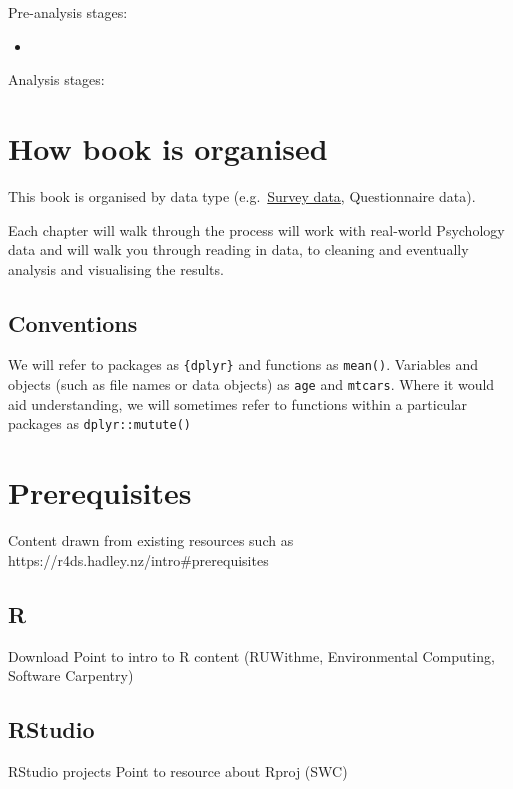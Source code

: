 \documentclass[
  letterpaper,
  DIV=11,
  numbers=noendperiod]{scrreprt}
\providecommand{\tightlist}{%
  \setlength{\itemsep}{0pt}\setlength{\parskip}{0pt}}\usepackage{longtable,booktabs,array}
\begin{document}
Pre-analysis stages:

\begin{itemize}
\tightlist
\item
\end{itemize}

Analysis stages:

\section{How book is organised}\label{how-book-is-organised}

This book is organised by data type (e.g.~\href{survey.qmd}{Survey
data}, Questionnaire data).

Each chapter will walk through the process will work with real-world
Psychology data and will walk you through reading in data, to cleaning
and eventually analysis and visualising the results.

\subsection{Conventions}\label{conventions}

We will refer to packages as \texttt{\{dplyr\}} and functions as
\texttt{mean()}. Variables and objects (such as file names or data
objects) as \texttt{age} and \texttt{mtcars}. Where it would aid
understanding, we will sometimes refer to functions within a particular
packages as \texttt{dplyr::mutute()}

\section{Prerequisites}\label{prerequisites}

Content drawn from existing resources such as
https://r4ds.hadley.nz/intro\#prerequisites

\subsection{R}\label{r}

Download Point to intro to R content (RUWithme, Environmental Computing,
Software Carpentry)

\subsection{RStudio}\label{rstudio}

RStudio projects Point to resource about Rproj (SWC)
\end{document}
